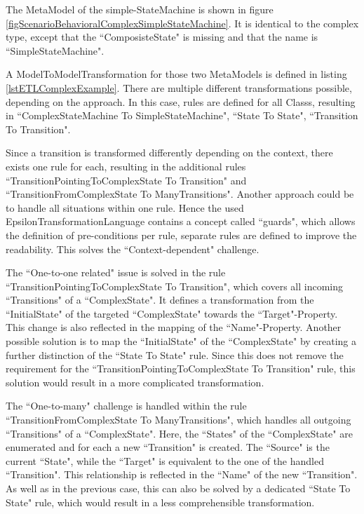 The \gls{MetaModel} of the simple-\gls{StateMachine} is shown in figure \ref{figScenarioBehavioralComplexSimpleStateMachine}. It is identical to the complex type, except that the ``ComposisteState" is missing and that the name is ``SimpleStateMachine".

A \gls{ModelToModelTransformation} for those two \glspl{MetaModel} is defined in listing \ref{lstETLComplexExample}. There are multiple different transformations possible, depending on the approach. In this case, rules are defined for all \glspl{Class}, resulting in ``ComplexStateMachine To SimpleStateMachine", ``State To State", ``Transition To Transition". 

Since a transition is transformed differently depending on the context, there exists one rule for each, resulting in the additional rules ``TransitionPointingToComplexState To Transition" and ``TransitionFromComplexState To ManyTransitions". Another approach could be to handle all situations within one rule. Hence the used \gls{EpsilonTransformationLanguage} contains a concept called ``guards", which allows the definition of pre-conditions per rule, separate rules are defined to improve the readability. This solves the ``Context-dependent" challenge.

The ``One-to-one related" issue is solved in the rule ``TransitionPointingToComplexState To Transition", which covers all incoming ``Transitions" of a ``ComplexState". It defines a transformation from the ``InitialState" of the targeted ``ComplexState" towards the ``Target"-\gls{Property}. This change is also reflected in the mapping of the ``Name"-\gls{Property}. Another possible solution is to map the ``InitialState" of the ``ComplexState" by creating a further distinction of the ``State To State" rule. Since this does not remove the requirement for the ``TransitionPointingToComplexState To Transition" rule, this solution would result in a more complicated transformation.

The ``One-to-many" challenge is handled within the rule ``TransitionFromComplexState To ManyTransitions", which handles all outgoing ``Transitions" of a ``ComplexState". Here, the ``States" of the ``ComplexState" are enumerated and for each a new ``Transition" is created. The ``Source" is the current ``State", while the ``Target" is equivalent to the one of the handled ``Transition". This relationship is reflected in the ``Name" of the new ``Transition". As well as in the previous case, this can also be solved by a dedicated ``State To State" rule, which would result in a less comprehensible transformation.

